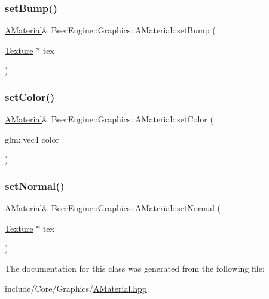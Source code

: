 \subsubsection{\texorpdfstring{set\+Bump()}{setBump()}}
{\footnotesize\ttfamily \mbox{\hyperlink{class_beer_engine_1_1_graphics_1_1_a_material}{A\+Material}}\& Beer\+Engine\+::\+Graphics\+::\+A\+Material\+::set\+Bump (\begin{DoxyParamCaption}\item[{\mbox{\hyperlink{class_beer_engine_1_1_graphics_1_1_texture}{Texture}} $\ast$}]{tex }\end{DoxyParamCaption})}

\mbox{\label{class_beer_engine_1_1_graphics_1_1_a_material_aee06176499221fa6f100299bbd9bf24a}} 
\subsubsection{\texorpdfstring{set\+Color()}{setColor()}}
{\footnotesize\ttfamily \mbox{\hyperlink{class_beer_engine_1_1_graphics_1_1_a_material}{A\+Material}}\& Beer\+Engine\+::\+Graphics\+::\+A\+Material\+::set\+Color (\begin{DoxyParamCaption}\item[{glm\+::vec4}]{color }\end{DoxyParamCaption})}

\mbox{\label{class_beer_engine_1_1_graphics_1_1_a_material_aa7e96809befbf9fe3098f49aeef0d25a}} 
\subsubsection{\texorpdfstring{set\+Normal()}{setNormal()}}
{\footnotesize\ttfamily \mbox{\hyperlink{class_beer_engine_1_1_graphics_1_1_a_material}{A\+Material}}\& Beer\+Engine\+::\+Graphics\+::\+A\+Material\+::set\+Normal (\begin{DoxyParamCaption}\item[{\mbox{\hyperlink{class_beer_engine_1_1_graphics_1_1_texture}{Texture}} $\ast$}]{tex }\end{DoxyParamCaption})}



The documentation for this class was generated from the following file\+:\begin{DoxyCompactItemize}
\item 
include/\+Core/\+Graphics/\mbox{\hyperlink{_a_material_8hpp}{A\+Material.\+hpp}}\end{DoxyCompactItemize}
